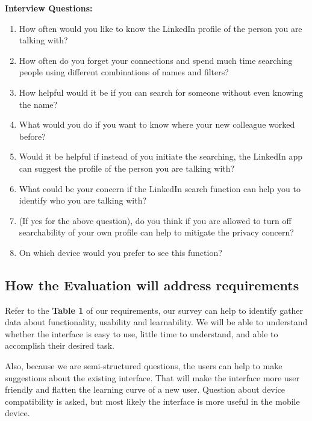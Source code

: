 \documentclass[
	letterpaper, %
]{jdf}
\begin{document}
\textbf{Interview Questions:}
\begin{enumerate}
    \item How often would you like to know the LinkedIn profile of the person you are talking with?
    \item How often do you forget your connections and spend much time searching people using different combinations of names and filters?
    \item How helpful would it be if you can search for someone without even knowing the name?
    \item What would you do if you want to know where your new colleague worked before?
    \item Would it be helpful if instead of you initiate the searching, the LinkedIn app can suggest the profile of the person you are talking with?
    \item What could be your concern if the LinkedIn search function can help you to identify who you are talking with?
    \item (If yes for the above question), do you think if you are allowed to turn off searchability of your own profile can help to mitigate the privacy concern?
    \item On which device would you prefer to see this function?
\end{enumerate}

\subsection{How the Evaluation will address requirements}
Refer to the \textbf{Table 1} of our requirements, our survey can help to identify gather data about functionality, usability and learnability. We will be able to understand whether the interface is easy to use, little time to understand, and able to accomplish their desired task.

Also, because we are semi-structured questions, the users can help to make suggestions about the existing interface. That will make the interface more user friendly and flatten the learning curve of a new user. Question about device compatibility is asked, but most likely the interface is more useful in the mobile device. 
\end{document}
